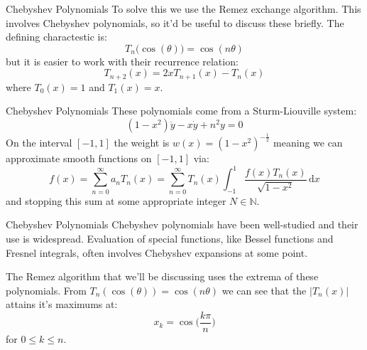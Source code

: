 \documentclass{beamer}
\begin{document}
    \begin{frame}{Chebyshev Polynomials}
        To solve this we use the Remez exchange algorithm. This involves
        Chebyshev polynomials, so it'd be useful to discuss these briefly.
        The defining charactestic is:
        \begin{equation}
            T_{n}\big(\cos(\theta)\big)=\cos(n\theta)
        \end{equation}
        but it is easier to work with their recurrence relation:
        \begin{equation}
            T_{n+2}(x)=2xT_{n+1}(x)-T_{n}(x)
        \end{equation}
        where $T_{0}(x)=1$ and $T_{1}(x)=x$.
    \end{frame}
    \begin{frame}{Chebyshev Polynomials}
        These polynomials come from a Sturm-Liouville system:
        \begin{equation}
            (1-x^{2})\ddot{y}-x\dot{y}+n^{2}y=0
        \end{equation}
        On the interval $[-1,1]$ the weight is
        $w(x)=(1-x^{2})^{-\frac{1}{2}}$ meaning we can approximate smooth
        functions on $[-1,1]$ via:
        \begin{equation}
            f(x)
            =\sum_{n=0}^{\infty}a_{n}T_{n}(x)
            =\sum_{n=0}^{\infty}T_{n}(x)\int_{-1}^{1}
                \frac{f(x)T_{n}(x)}{\sqrt{1-x^2}}\,\textrm{d}x
        \end{equation}
        and stopping this sum at some appropriate integer $N\in\mathbb{N}$.
    \end{frame}
    \begin{frame}{Chebyshev Polynomials}
        Chebyshev polynomials have been well-studied and their use is
        widespread. Evaluation of special functions, like Bessel functions and
        Fresnel integrals, often involves Chebyshev expansions at some point.
        \par\hfill\par
        The Remez algorithm that we'll be discussing uses the extrema of these
        polynomials. From $T_{n}(\cos(\theta))=\cos(n\theta)$ we can see that
        the $|T_{n}(x)|$ attains it's maximums at:
        \begin{equation}
            x_{k}=\cos\Big(\frac{k\pi}{n}\Big)
        \end{equation}
        for $0\leq{k}\leq{n}$.
    \end{frame}
\end{document}
